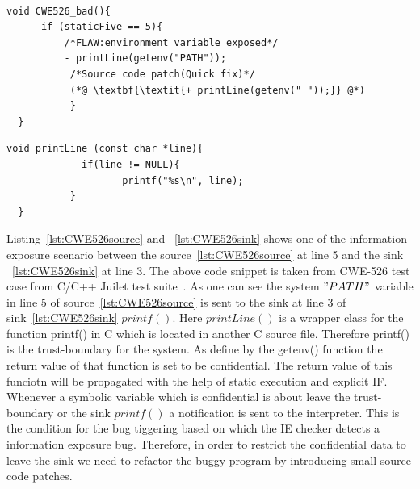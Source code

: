 \begin{lstlisting}[caption={CWE-526 test programs source},label={lst:CWE526source}]

void CWE526_bad(){
      if (staticFive == 5){
          /*FLAW:environment variable exposed*/
          - printLine(getenv("PATH"));
           /*Source code patch(Quick fix)*/
           (*@ \textbf{\textit{+ printLine(getenv(" "));}} @*) 
           }
  }
\end{lstlisting}
 

\begin{lstlisting}[caption={CWE-526 test programs sink},label={lst:CWE526sink}]
void printLine (const char *line){
             if(line != NULL){
                    printf("%s\n", line);
           }
  }
\end{lstlisting}

Listing~\ref{lst:CWE526source} and ~\ref{lst:CWE526sink} shows one of the information
exposure scenario between the source~\ref{lst:CWE526source} at line 5 and the sink
~\ref{lst:CWE526sink} at line 3. The above code snippet is taken from CWE-526 test case
from C/C++ Juilet test suite~\cite{Juliet:test}. As one can see the system $"PATH"$ variable in line 5 of source~\ref{lst:CWE526source}
is sent to the sink at line 3 of sink~\ref{lst:CWE526sink} $printf()$. Here $printLine()$
is a wrapper class for the function printf() in C which is located in another C source file.
Therefore printf() is the trust-boundary for the system. As define by the getenv() function
the return value of that function is set to be confidential. The return value of this funciotn
will be propagated with the help of static execution and explicit IF. Whenever 
a symbolic variable which is confidential is about leave the trust-boundary or the sink
$printf()$ a notification is sent to the interpreter. This is the condition
for the bug tiggering based on which the IE checker detects a information exposure bug.
Therefore, in order to restrict the confidential data to leave the sink we need to refactor the 
buggy program by introducing small source code patches.

